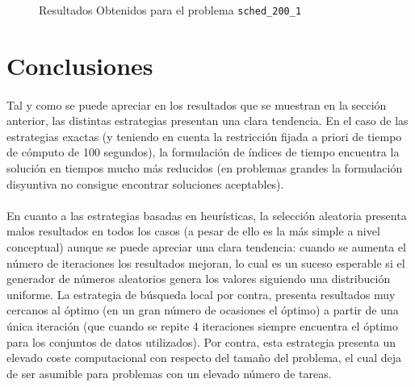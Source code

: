 \documentclass[spanish]{article}
\begin{document}
			\begin{figure}
				\begin{center}
				\end{center}
				\caption{Resultados Obtenidos para el problema \texttt{sched\_200\_1}}
				\label{plot:sol-sched_200_1}
			\end{figure}

	\section{Conclusiones}

		\paragraph{}
		Tal y como se puede apreciar en los resultados que se muestran en la sección anterior, las distintas estrategias presentan una clara tendencia. En el caso de las estrategias exactas (y teniendo en cuenta la restricción fijada a priori de tiempo de cómputo de 100 segundos), la formulación de índices de tiempo encuentra la solución en tiempos mucho más reducidos (en problemas grandes la formulación disyuntiva no consigue encontrar soluciones aceptables).

		\paragraph{}
		En cuanto a las estrategias basadas en heurísticas, la selección aleatoria presenta malos resultados en todos los casos (a pesar de ello es la más simple a nivel conceptual) aunque se puede apreciar una clara tendencia: cuando se aumenta el número de iteraciones los resultados mejoran, lo cual es un suceso esperable si el generador de números aleatorios genera los valores siguiendo una distribución uniforme. La estrategia de búsqueda local por contra, presenta resultados muy cercanos al óptimo (en un gran número de ocasiones el óptimo) a partir de una única iteración (que cuando se repite 4 iteraciones siempre encuentra el óptimo para los conjuntos de datos utilizados). Por contra, esta estrategia presenta un elevado coste computacional con respecto del tamaño del problema, el cual deja de ser asumible para problemas con un elevado número de tareas.
\end{document}
